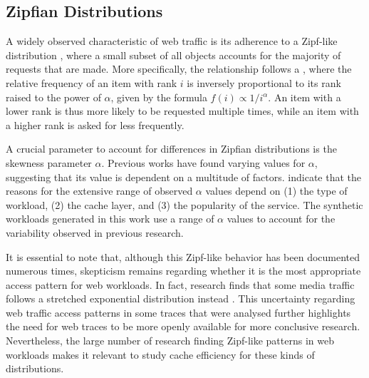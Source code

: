 \subsection{Zipfian Distributions}\label{bkg: zipfian-distributions}

A widely observed characteristic of web traffic is its adherence to a Zipf-like distribution \cite{sieve, web-cache-overview, s3-fifo, internet-zipf, zipf-analysis}, where a small subset of all objects accounts for the majority of requests that are made. More specifically, the relationship follows a , where the relative frequency of an item with rank $i$ is inversely proportional to its rank raised to the power of $\alpha$, given by the formula \(f(i)\propto{1}/{i^\alpha}\). An item with a lower rank is thus more likely to be requested multiple times, while an item with a higher rank is asked for less frequently. 


A crucial parameter to account for differences in Zipfian distributions is the skewness parameter $\alpha$. Previous works \cite{twitter-analysis, youtube-traffic, sieve} have found varying values for $\alpha$, suggesting that its value is dependent on a multitude of factors. \citeauthor{sieve} \cite{sieve} indicate that the reasons for the extensive range of observed $\alpha$ values depend on (1) the type of workload, (2) the cache layer, and (3) the popularity of the service. The synthetic workloads generated in this work use a range of $\alpha$ values to account for the variability observed in previous research.

It is essential to note that, although this Zipf-like behavior has been documented numerous times, skepticism remains regarding whether it is the most appropriate access pattern for web workloads. In fact, research finds that some media traffic follows a stretched exponential distribution instead \cite{stretched-exponential, internet-zipf}. This uncertainty regarding web traffic access patterns in some traces that were analysed further highlights the need for web traces to be more openly available for more conclusive research. Nevertheless, the large number of research finding Zipf-like patterns in web workloads makes it relevant to study cache efficiency for these kinds of distributions.







